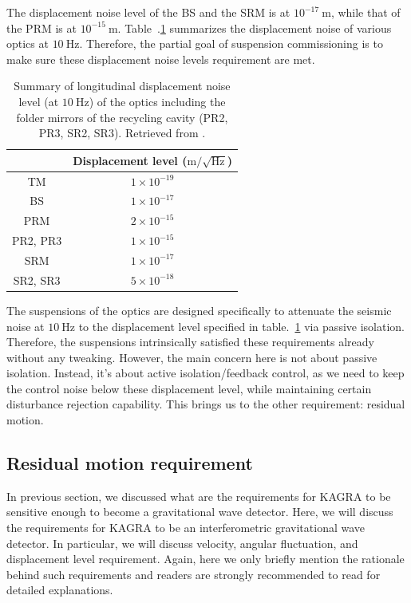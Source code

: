 The displacement noise level of the BS and the SRM is at $10^{-17}~\mathrm{m}$, while that of the PRM is at $10^{-15}~\mathrm{m}$.
Table~.\ref{table:displacement_noise_requirement} summarizes the displacement noise of various optics at $10~\mathrm{Hz}$.
Therefore, the partial goal of suspension commissioning is to make sure these displacement noise levels requirement are met.
\begin{table}[!h]
	\centering
	\begin{tabular}{|c|c|}
		\hline
		& Displacement level ($\mathrm{m}/\sqrt{\mathrm{Hz}}$)\\
		\hline
		TM &  $1\times 10^{-19}$\\
		\hline
		BS &  $1\times 10^{-17}$\\
		\hline
		PRM & $2\times 10^{-15}$\\
		\hline
		PR2, PR3 & $1\times 10^{-15}$\\
		\hline
		SRM & $1\times 10^{-17}$\\
		\hline
		SR2, SR3 & $5\times 10^{-18}$\\
		\hline
	\end{tabular}
	\caption{Summary of longitudinal displacement noise level (at $10~\mathrm{Hz}$) of the optics including the folder mirrors of the recycling cavity (PR2, PR3, SR2, SR3). Retrieved from \cite{Sekiguchi:2016bmv}.}
	\label{table:displacement_noise_requirement}
\end{table}
The suspensions of the optics are designed specifically to attenuate the seismic noise at $10~\mathrm{Hz}$ to the displacement level specified in table.~\ref{table:displacement_noise_requirement} via passive isolation.
Therefore, the suspensions intrinsically satisfied these requirements already without any tweaking.
However, the main concern here is not about passive isolation.
Instead, it's about active isolation/feedback control, as we need to keep the control noise below these displacement level, while maintaining certain disturbance rejection capability.
This brings us to the other requirement: residual motion.

\subsection{Residual motion requirement \label{sec:residual_motion_requirement}}
In previous section, we discussed what are the requirements for KAGRA to be sensitive enough to become a gravitational wave detector.
Here, we will discuss the requirements for KAGRA to be an interferometric gravitational wave detector.
In particular, we will discuss velocity, angular fluctuation, and displacement level requirement.
Again, here we only briefly mention the rationale behind such requirements and readers are strongly recommended to read \cite{Sekiguchi:2016bmv} for detailed explanations.

